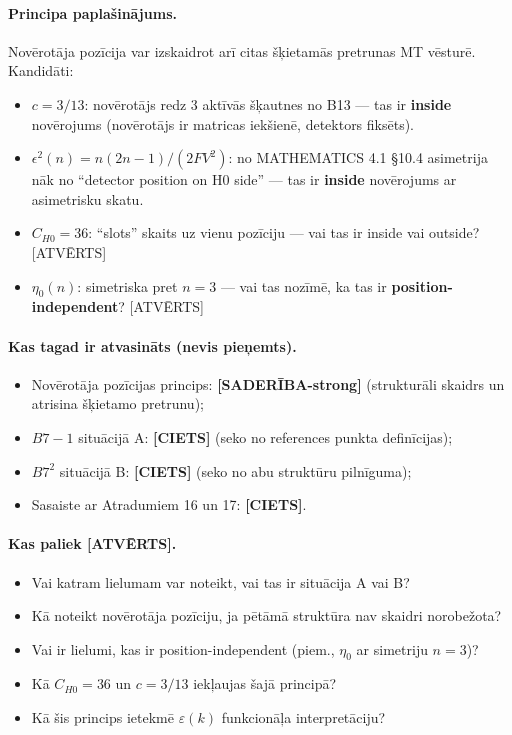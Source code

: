 \documentclass[12pt,a4paper]{article}
\begin{document}
\paragraph{Principa paplašinājums.}
Novērotāja pozīcija var izskaidrot arī citas šķietamās pretrunas MT vēsturē. Kandidāti:
\begin{itemize}
    \item $c = 3/13$: novērotājs redz 3 aktīvās šķautnes no B13 — tas ir \textbf{inside} novērojums (novērotājs ir matricas iekšienē, detektors fiksēts).
    \item $\epsilon^2(n) = n(2n-1)/(2FV^2)$: no MATHEMATICS 4.1 §10.4 asimetrija nāk no ``detector position on H0 side'' — tas ir \textbf{inside} novērojums ar asimetrisku skatu.
    \item $C_{H0} = 36$: ``slots'' skaits uz vienu pozīciju — vai tas ir inside vai outside? [ATVĒRTS]
    \item $\eta_0(n)$: simetriska pret $n=3$ — vai tas nozīmē, ka tas ir \textbf{position-independent}? [ATVĒRTS]
\end{itemize}

\paragraph{Kas tagad ir atvasināts (nevis pieņemts).}
\begin{itemize}
    \item Novērotāja pozīcijas princips: \textbf{[SADERĪBA-strong]} (strukturāli skaidrs un atrisina šķietamo pretrunu);
    \item $B7-1$ situācijā A: \textbf{[CIETS]} (seko no references punkta definīcijas);
    \item $B7^2$ situācijā B: \textbf{[CIETS]} (seko no abu struktūru pilnīguma);
    \item Sasaiste ar Atradumiem 16 un 17: \textbf{[CIETS]}.
\end{itemize}

\paragraph{Kas paliek [ATVĒRTS].}
\begin{itemize}
    \item Vai katram lielumam var noteikt, vai tas ir situācija A vai B?
    \item Kā noteikt novērotāja pozīciju, ja pētāmā struktūra nav skaidri norobežota?
    \item Vai ir lielumi, kas ir position-independent (piem., $\eta_0$ ar simetriju $n=3$)?
    \item Kā $C_{H0} = 36$ un $c = 3/13$ iekļaujas šajā principā?
    \item Kā šis princips ietekmē $\varepsilon(k)$ funkcionāļa interpretāciju?
\end{itemize}
\end{document}
